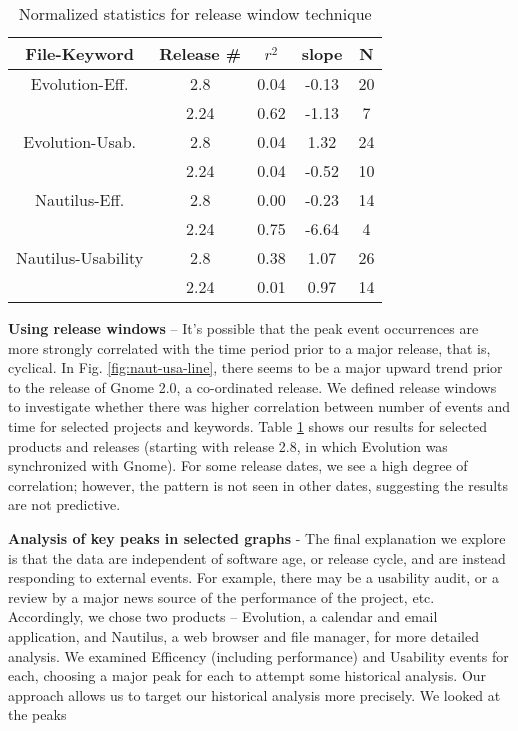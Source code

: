 \documentclass[conference, compsoc]{IEEEtran}
\begin{document}
\begin{table}
	\caption{Normalized statistics for release window technique}
	\centering
	\label{tbl:windows}
\begin{tabular}{|c|c|c|c|c|}
\hline
\rowcolor[gray]{.9} 
File-Keyword & Release \# & $r^2$ & slope & N\\ \hline
Evolution-Eff. & 2.8 & 0.04 & -0.13 & 20 \\
 & 2.24 & 0.62 & -1.13 & 7\\ \hline
Evolution-Usab. & 2.8 & 0.04 & 1.32 & 24\\
 & 2.24 & 0.04 & -0.52 & 10 \\ \hline
Nautilus-Eff. & 2.8 & 0.00 & -0.23 & 14 \\
 & 2.24 & 0.75 & -6.64 & 4 \\ \hline
Nautilus-Usability & 2.8 & 0.38 & 1.07 & 26\\
 & 2.24 & 0.01 & 0.97 & 14\\

\hline
\end{tabular}
\end{table}

\noindent\textbf{Using release windows} -- It's possible that the peak event occurrences are more strongly correlated with the time period prior to a major release, that is, cyclical. In Fig. \ref{fig:naut-usa-line}, there seems to be a major upward trend prior to the release of Gnome 2.0, a co-ordinated release. We defined release windows to investigate whether there was higher correlation between number of events and time for selected projects and keywords. Table \ref{tbl:windows} shows our results for selected products and releases (starting with release 2.8, in which Evolution was synchronized with Gnome). For some release dates, we see a high degree of correlation; however, the pattern is not seen in other dates, suggesting the results are not predictive. 

\noindent\textbf{Analysis of key peaks in selected graphs} - The final explanation we explore is that the data are independent of software age, or release cycle, and are instead responding to external events. For example, there may be a usability audit, or a review by a major news source of the performance of the project, etc. Accordingly, we chose two products -- Evolution, a calendar and email application, and Nautilus, a web browser and file manager, for more detailed analysis. We examined Efficency (including performance) and Usability events for each, choosing a major peak for each to attempt some historical analysis. Our approach allows us to target our historical analysis more precisely. We looked at the peaks
\end{document}
